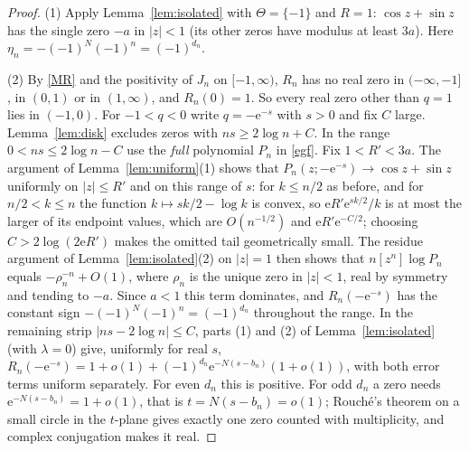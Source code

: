 \documentclass[11pt,a4paper]{article}
\theoremstyle{remark}
\newcommand{\coef}[1]{[z^{#1}]}
\newcommand{\e}{\mathrm e}
\begin{document}
\begin{proof}
(1) Apply Lemma~\ref{lem:isolated} with $\Theta=\{-1\}$ and $R=1$: $\cos z+\sin z$ has the single zero $-a$ in $|z|<1$ (its other zeros have modulus at least $3a$). Here $\eta_n=-(-1)^N(-1)^n=(-1)^{d_n}$.

(2) By \eqref{MR} and the positivity of $J_n$ on $[-1,\infty)$, $R_n$ has no real zero in $(-\infty,-1]$, in $(0,1)$ or in $(1,\infty)$, and $R_n(0)=1$. So every real zero other than $q=1$ lies in $(-1,0)$. For $-1<q<0$ write $q=-\e^{-s}$ with $s>0$ and fix $C$ large. Lemma~\ref{lem:disk} excludes zeros with $ns\ge2\log n+C$. In the range $0<ns\le2\log n-C$ use the \emph{full} polynomial $P_n$ in \eqref{egf}. Fix $1<R'<3a$. The argument of Lemma~\ref{lem:uniform}(1) shows that $P_n(z;-\e^{-s})\to\cos z+\sin z$ uniformly on $|z|\le R'$ and on this range of $s$: for $k\le n/2$ as before, and for $n/2<k\le n$ the function $k\mapsto sk/2-\log k$ is convex, so $\e R'\e^{sk/2}/k$ is at most the larger of its endpoint values, which are $O(n^{-1/2})$ and $\e R'\e^{-C/2}$; choosing $C>2\log(2\e R')$ makes the omitted tail geometrically small. The residue argument of Lemma~\ref{lem:isolated}(2) on $|z|=1$ then shows that $n\coef n\log P_n$ equals $-\rho_n^{-n}+O(1)$, where $\rho_n$ is the unique zero in $|z|<1$, real by symmetry and tending to $-a$. Since $a<1$ this term dominates, and $R_n(-\e^{-s})$ has the constant sign $-(-1)^{N}(-1)^n=(-1)^{d_n}$ throughout the range. In the remaining strip $|ns-2\log n|\le C$, parts (1) and (2) of Lemma~\ref{lem:isolated} (with $\lambda=0$) give, uniformly for real $s$, $R_n(-\e^{-s})=1+o(1)+(-1)^{d_n}\e^{-N(s-b_n)}(1+o(1))$, with both error terms uniform separately. For even $d_n$ this is positive. For odd $d_n$ a zero needs $\e^{-N(s-b_n)}=1+o(1)$, that is $t=N(s-b_n)=o(1)$; Rouch\'e's theorem on a small circle in the $t$-plane gives exactly one zero counted with multiplicity, and complex conjugation makes it real.


\end{proof}
\end{document}
